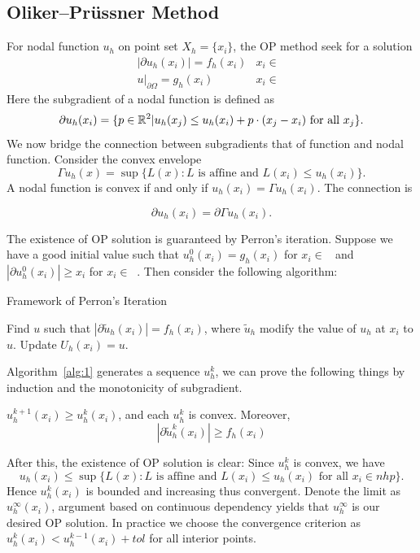 \documentclass{article}
\DeclareMathOperator{\nhi}{\mathcal N_h^{I}}
\DeclareMathOperator{\nhp}{\mathcal N_h^{\partial}}
\begin{document}
\subsection{Oliker--Pr\"ussner Method}
For nodal function $u_h$ on point set $X_h = \{x_i\}$, the OP method seek for a solution 
\begin{align}
|\partial u_h(x_i)| = f_h(x_i) & x_i \in \nhi\\ 
u|_{\partial \Omega} = g_h(x_i) & x_i \in \nhp
\end{align}
Here the subgradient of a nodal function is defined as 
$$\partial u_h(x_i) = \{p \in \mathbb R^2|u_h(x_j) \le u_h(x_i) + p\cdot (x_j-x_i) \text{ for all } x_j\}.$$
We now bridge the connection between subgradients that of function and nodal function. Consider the convex envelope 
$$\Gamma u_h(x) =  \sup\{L(x): L \text{ is affine and } L(x_i) \le u_h(x_i)\}.$$
A nodal function is convex if and only if $u_h(x_i) = \Gamma u_h(x_i)$.
The connection is 
\begin{proposition}
	$$\partial u_h(x_i) = \partial \Gamma u_h(x_i).$$
\end{proposition}
The existence of OP solution is guaranteed by Perron's iteration. Suppose we have a good initial value such that $u_h^0(x_i) = g_h(x_i)$ for $x_i \in \nhp$ and $|\partial u_h^0(x_i)| \ge x_i$ for $x_i \in \nhi$. Then consider the following algorithm:
\begin{algorithm}[H]
	\caption{Framework of Perron's Iteration}
	\label{alg:1}
	\begin{algorithmic}[1]
		\FOR{$x_i \in \nhi$}
		\STATE Find $u$ such that $|\partial \tilde u_h(x_i)| = f_h(x_i)$, where $\tilde u_h$ modify the value of $u_h$ at $x_i$ to $u$.
		\STATE Update $U_h(x_i) = u$.
		\ENDFOR
		\ENDWHILE
	\end{algorithmic}
\end{algorithm}
Algorithm~\ref{alg:1} generates a sequence $u_h^k$, we can prove the following things by induction and the monotonicity of subgradient. 
\begin{proposition}
	$u_h^{k+1}(x_i) \ge u_h^{k}(x_i)$, and each $u_h^k$ is convex. Moreover, 	$$|\partial \tilde u_h^k(x_i)| \ge f_h(x_i)$$
\end{proposition}
After this, the existence of OP solution is clear: Since $u_h^k$ is convex, we have $$u_h(x_i) \le  \sup\{L(x): L \text{ is affine and } L(x_i) \le u_h(x_i) \text{ for all } x_i \in nhp\}.$$
Hence $u_h^k(x_i)$ is bounded and increasing thus convergent. Denote the limit as $u_h^{\infty}(x_i)$, argument based on continuous dependency yields that $u_h^{\infty}$ is our desired OP solution. In practice we choose the convergence criterion as $u_h^{k}(x_i) < u_h^{k-1}(x_i) + tol$ for all interior points.
\end{document}
